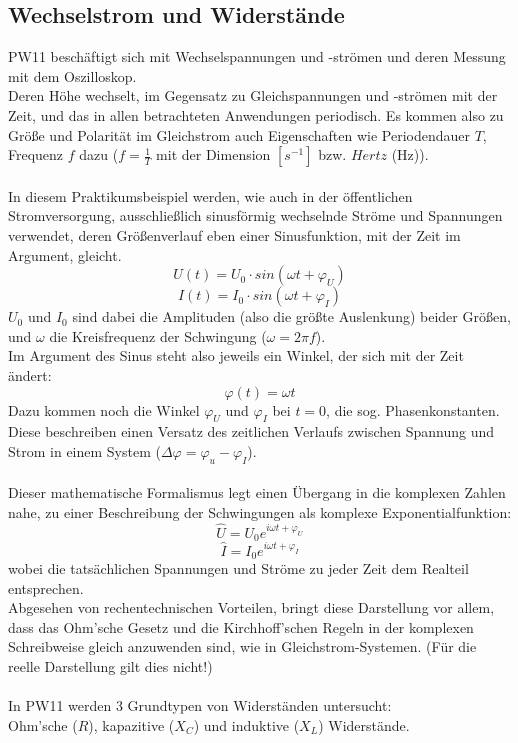 \documentclass[12pt,a4paper]{article}
\begin{document}
\begin{multicols}{2}
\subsection{Wechselstrom und Widerstände}
PW11 beschäftigt sich mit Wechselspannungen und -strömen und deren Messung mit dem Oszilloskop.\\
Deren Höhe wechselt, im Gegensatz zu Gleichspannungen und -strömen mit der Zeit, und das in allen betrachteten Anwendungen periodisch. Es kommen also zu Größe und Polarität im Gleichstrom auch Eigenschaften wie Periodendauer $T$, Frequenz $f$ dazu ($f = \frac{1}{T}$ mit der Dimension $[s^{-1}]$ bzw. $Hertz$ (Hz)).\\
\\
In diesem Praktikumsbeispiel werden, wie auch in der öffentlichen Stromversorgung, ausschließlich sinusförmig wechselnde Ströme und Spannungen verwendet, deren Größenverlauf eben einer Sinusfunktion, mit der Zeit im Argument, gleicht.\\
$$U(t)=U_0\cdot sin(\omega t + \varphi_U)$$
$$I(t)=I_0\cdot sin(\omega t + \varphi_I)$$
$U_0$ und $I_0$ sind dabei die Amplituden (also die größte Auslenkung) beider Größen, und $\omega$ die Kreisfrequenz der Schwingung ($\omega = 2 \pi f$).\\
Im Argument des Sinus steht also jeweils ein Winkel, der sich mit der Zeit ändert:
$$\varphi (t) = \omega t$$
Dazu kommen noch die Winkel $\varphi_U$ und $\varphi_I $ bei $t=0$, die sog. Phasenkonstanten. Diese beschreiben einen Versatz des zeitlichen Verlaufs zwischen Spannung und Strom in einem System ($\Delta \varphi = \varphi_u - \varphi_I$).\\
\\
Dieser mathematische Formalismus legt einen Übergang in die komplexen Zahlen nahe, zu einer Beschreibung der Schwingungen als komplexe Exponentialfunktion:
$$\hat{U} = U_0e^{i \omega t + \varphi_U}$$
$$\hat{I} = I_0e^{i \omega t + \varphi_I}$$
wobei die tatsächlichen Spannungen und Ströme zu jeder Zeit dem Realteil entsprechen.\\
Abgesehen von rechentechnischen Vorteilen, bringt diese Darstellung vor allem, dass das Ohm'sche Gesetz und die Kirchhoff'schen Regeln in der komplexen Schreibweise gleich anzuwenden sind, wie in Gleichstrom-Systemen. (Für die reelle Darstellung gilt dies nicht!)\\
\\
In PW11 werden 3 Grundtypen von Widerständen untersucht:\\
Ohm'sche ($R$), kapazitive ($X_C$) und induktive ($X_L$) Widerstände.\\

\end{multicols}
\end{document}
